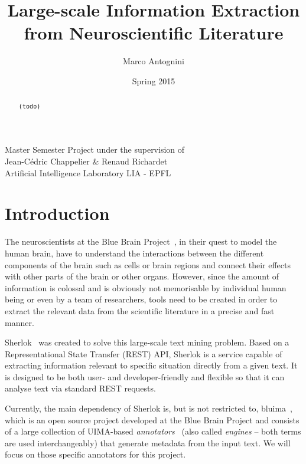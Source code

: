 \documentclass{article}
\title{Large-scale Information Extraction from Neuroscientific Literature}
\date{Spring 2015}
\author{Marco Antognini}
\newcommand{\TODO}[1]{\texttt{\textcolor{YellowOrange}{(#1)}}} %
\begin{document}
\maketitle

\begin{center}
    Master Semester Project under the supervision of\\
    Jean-Cédric Chappelier \& Renaud Richardet\\
    Artificial Intelligence Laboratory LIA - EPFL
\end{center}

\begin{abstract}
  \TODO{todo}
\end{abstract}

\newpage
{}


\tableofcontents

\section{Introduction}

The neuroscientists at the Blue Brain Project~\cite{bbp}, in their quest to model the human brain,
have to understand the interactions between the different components of the brain such as cells or
brain regions and connect their effects with other parts of the brain or other organs.  However,
since the amount of information is colossal and is obviously not memorisable by individual human
being or even by a team of researchers, tools need to be created in order to extract the relevant
data from the scientific literature in a precise and fast manner.

Sherlok~\cite{sherlok} was created to solve this large-scale text mining problem. Based on a
Representational State Transfer (REST) API, Sherlok is a service capable of extracting information
relevant to specific situation directly from a given text. It is designed to be both user- and
developer-friendly and flexible so that it can analyse text via standard REST requests.

Currently, the main dependency of Sherlok is, but is not restricted to, bluima~\cite{bluima}, which
is an open source project developed at the Blue Brain Project and consists of a large collection of
UIMA-based \emph{annotators}~\cite{uima} (also called \emph{engines} -- both terms are used
interchangeably) that generate metadata from the input text. We will focus on those specific
annotators for this project.
\end{document}
